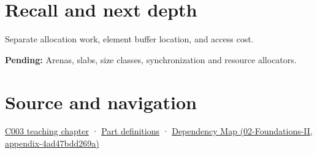 \section{Recall and next depth}\label{appendix-c3480f7d9ff3-recall-and-next-depth}

Separate allocation work, element buffer location, and access cost.

\textbf{Pending:} Arenas, slabs, size classes, synchronization and resource allocators.

\section{Source and navigation}\label{appendix-c3480f7d9ff3-source-and-navigation}

\href{Continuous\%20Notes/Computing\%20Foundations\%20-\%20From\%20Bits\%20to\%20C++\%20and\%20Systems\%20APIs\#Where\%20the\%20bytes\%20live}{C003 teaching chapter} · \hyperref[appendix-fd090d982a15-m003---parts-41-60]{Part definitions} · \href{../02-Foundations-II/main.pdf\#nameddest=appendix-4ad47bdd269a}{Dependency Map (02-Foundations-II, appendix-4ad47bdd269a)}
